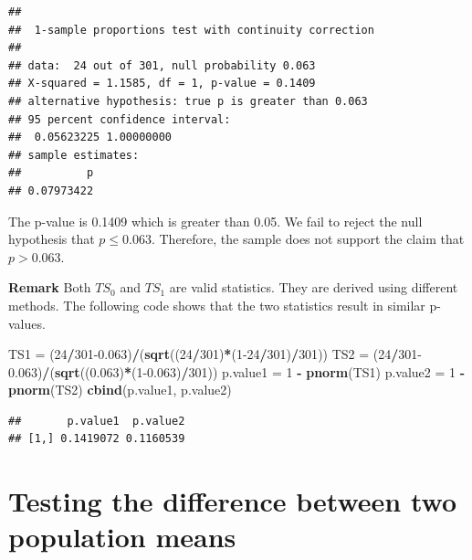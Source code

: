 \documentclass[
]{book}
\newenvironment{Shaded}{\begin{snugshade}}{\end{snugshade}}
\newcommand{\DecValTok}[1]{\textcolor[rgb]{0.00,0.00,0.81}{#1}}
\newcommand{\FloatTok}[1]{\textcolor[rgb]{0.00,0.00,0.81}{#1}}
\newcommand{\FunctionTok}[1]{\textcolor[rgb]{0.13,0.29,0.53}{\textbf{#1}}}
\newcommand{\NormalTok}[1]{#1}
\newcommand{\OtherTok}[1]{\textcolor[rgb]{0.56,0.35,0.01}{#1}}
\newcommand{\SpecialCharTok}[1]{\textcolor[rgb]{0.81,0.36,0.00}{\textbf{#1}}}
\begin{document}
\begin{verbatim}
## 
##  1-sample proportions test with continuity correction
## 
## data:  24 out of 301, null probability 0.063
## X-squared = 1.1585, df = 1, p-value = 0.1409
## alternative hypothesis: true p is greater than 0.063
## 95 percent confidence interval:
##  0.05623225 1.00000000
## sample estimates:
##          p 
## 0.07973422
\end{verbatim}

The p-value is 0.1409 which is greater than 0.05. We fail to reject the null hypothesis that \(p \le 0.063\). Therefore, the sample does not support the claim that \(p > 0.063\).

\textbf{Remark} Both \(TS_0\) and \(TS_1\) are valid statistics. They are derived using different methods. The following code shows that the two statistics result in similar p-values.

\begin{Shaded}
\begin{Highlighting}[]
\NormalTok{TS1 }\OtherTok{=}\NormalTok{ (}\DecValTok{24}\SpecialCharTok{/}\DecValTok{301}\FloatTok{{-}0.063}\NormalTok{)}\SpecialCharTok{/}\NormalTok{(}\FunctionTok{sqrt}\NormalTok{((}\DecValTok{24}\SpecialCharTok{/}\DecValTok{301}\NormalTok{)}\SpecialCharTok{*}\NormalTok{(}\DecValTok{1{-}24}\SpecialCharTok{/}\DecValTok{301}\NormalTok{)}\SpecialCharTok{/}\DecValTok{301}\NormalTok{))}
\NormalTok{TS2 }\OtherTok{=}\NormalTok{ (}\DecValTok{24}\SpecialCharTok{/}\DecValTok{301}\FloatTok{{-}0.063}\NormalTok{)}\SpecialCharTok{/}\NormalTok{(}\FunctionTok{sqrt}\NormalTok{((}\FloatTok{0.063}\NormalTok{)}\SpecialCharTok{*}\NormalTok{(}\DecValTok{1}\FloatTok{{-}0.063}\NormalTok{)}\SpecialCharTok{/}\DecValTok{301}\NormalTok{))}
\NormalTok{p.value1 }\OtherTok{=} \DecValTok{1} \SpecialCharTok{{-}} \FunctionTok{pnorm}\NormalTok{(TS1)}
\NormalTok{p.value2 }\OtherTok{=} \DecValTok{1} \SpecialCharTok{{-}} \FunctionTok{pnorm}\NormalTok{(TS2)}
\FunctionTok{cbind}\NormalTok{(p.value1, p.value2)}
\end{Highlighting}
\end{Shaded}

\begin{verbatim}
##       p.value1  p.value2
## [1,] 0.1419072 0.1160539
\end{verbatim}

\hypertarget{testing-the-difference-between-two-population-means}{%
\section{Testing the difference between two population means}\label{testing-the-difference-between-two-population-means}}
\end{document}
